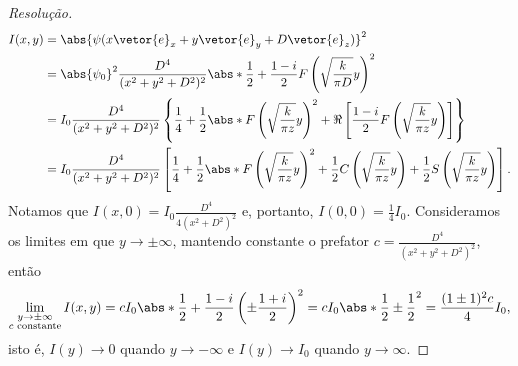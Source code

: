 \begin{proof}[Resolução]
    \begin{align*}
        I(x,y) &= \abs{\psi(x\vetor{e}_x + y\vetor{e}_y + D \vetor{e}_z)}^2\\
               &= \abs{\psi_0}^2 \frac{D^4}{(x^2 + y^2 + D^2)^2} \abs*{\frac12 + \frac{1 - i}{2} F\left(\sqrt{\frac{k}{\pi D}} y\right)}^2\\
               &= I_0 \frac{D^4}{(x^2 + y^2 + D^2)^2} \left\{\frac14 + \frac12\abs*{F\left(\sqrt{\frac{k}{\pi z}} y\right)}^2 + \Re\left[\frac{1 - i}{2} F\left(\sqrt{\frac{k}{\pi z}} y\right)\right]\right\}\\
               &= I_0 \frac{D^4}{(x^2 + y^2 + D^2)^2} \left[\frac14 + \frac12\abs*{F\left(\sqrt{\frac{k}{\pi z}} y\right)}^2 + \frac12 C\left(\sqrt{\frac{k}{\pi z}} y\right) + \frac12 S\left(\sqrt{\frac{k}{\pi z}} y\right)\right].
    \end{align*}
    Notamos que \(I(x,0) = I_0\frac{D^4}{4(x^2 + D^2)^2}\) e, portanto, \(I(0,0) = \frac14 I_0\). Consideramos os limites em que \(y \to \pm \infty\), mantendo constante o prefator \(c = \frac{D^4}{(x^2 + y^2 + D^2)^2}\), então
    \begin{equation*}
        \lim_{\substack{y \to \pm \infty\\c \text{ constante}}} I(x,y) = c I_0 \abs*{\frac12 + \frac{1 - i}{2} \left(\pm \frac{1 + i}{2}\right)}^2 = c I_0 \abs*{\frac12 \pm \frac12}^2 = \frac{(1 \pm 1)^2 c}{4}I_0,
    \end{equation*}
    isto é, \(I(y) \to 0\) quando \(y \to -\infty\) e \(I(y) \to I_0\) quando \(y \to \infty.\)
\end{proof}
